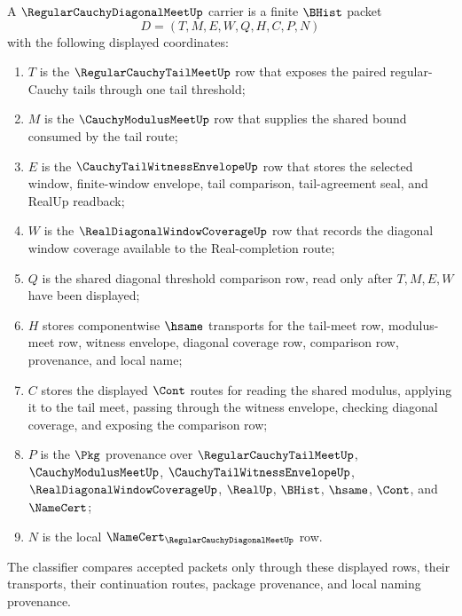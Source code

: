 \begin{definition}
\label{def:regular-cauchy-diagonal-meet-carrier}
A $\RegularCauchyDiagonalMeetUp$ carrier is a finite $\BHist$ packet
$$
D=(T,M,E,W,Q,H,C,P,N)
$$
with the following displayed coordinates:
\begin{enumerate}
\item $T$ is the $\RegularCauchyTailMeetUp$ row that exposes the paired regular-Cauchy tails through one tail threshold;
\item $M$ is the $\CauchyModulusMeetUp$ row that supplies the shared bound consumed by the tail route;
\item $E$ is the $\CauchyTailWitnessEnvelopeUp$ row that stores the selected window, finite-window envelope, tail comparison, tail-agreement seal, and RealUp readback;
\item $W$ is the $\RealDiagonalWindowCoverageUp$ row that records the diagonal window coverage available to the Real-completion route;
\item $Q$ is the shared diagonal threshold comparison row, read only after $T,M,E,W$ have been displayed;
\item $H$ stores componentwise $\hsame$ transports for the tail-meet row, modulus-meet row, witness envelope, diagonal coverage row, comparison row, provenance, and local name;
\item $C$ stores the displayed $\Cont$ routes for reading the shared modulus, applying it to the tail meet, passing through the witness envelope, checking diagonal coverage, and exposing the comparison row;
\item $P$ is the $\Pkg$ provenance over $\RegularCauchyTailMeetUp$, $\CauchyModulusMeetUp$, $\CauchyTailWitnessEnvelopeUp$, $\RealDiagonalWindowCoverageUp$, $\RealUp$, $\BHist$, $\hsame$, $\Cont$, and $\NameCert$;
\item $N$ is the local $\NameCert_{\RegularCauchyDiagonalMeetUp}$ row.
\end{enumerate}
The classifier compares accepted packets only through these displayed rows, their transports, their continuation routes, package provenance, and local naming provenance.
\end{definition}

